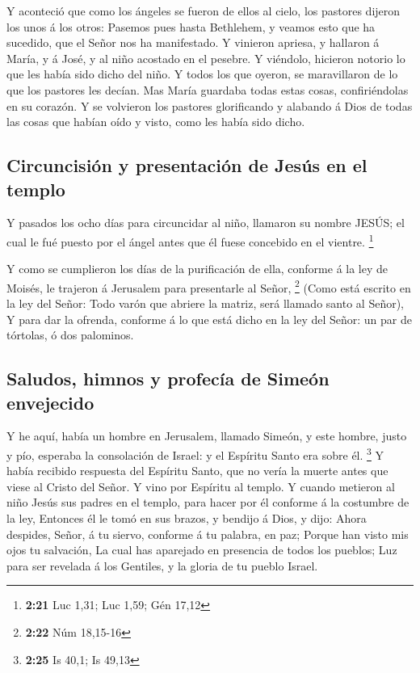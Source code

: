  Y aconteció que como los ángeles se fueron de ellos al
cielo, los pastores dijeron los unos á los otros: Pasemos pues hasta
Bethlehem, y veamos esto que ha sucedido, que el Señor nos ha
manifestado.  Y vinieron apriesa, y hallaron á María, y á
José, y al niño acostado en el pesebre.  Y viéndolo,
hicieron notorio lo que les había sido dicho del niño.  Y
todos los que oyeron, se maravillaron de lo que los pastores les decían.
 Mas María guardaba todas estas cosas, confiriéndolas en
su corazón.  Y se volvieron los pastores glorificando y
alabando á Dios de todas las cosas que habían oído y visto, como les
había sido dicho.

\hypertarget{circuncisiuxf3n-y-presentaciuxf3n-de-jesuxfas-en-el-templo}{%
\subsection{Circuncisión y presentación de Jesús en el
templo}\label{circuncisiuxf3n-y-presentaciuxf3n-de-jesuxfas-en-el-templo}}

 Y pasados los ocho días para circuncidar al niño,
llamaron su nombre JESÚS; el cual le fué puesto por el ángel antes que
él fuese concebido en el vientre. \footnote{\textbf{2:21} Luc 1,31; Luc
  1,59; Gén 17,12}

 Y como se cumplieron los días de la purificación de
ella, conforme á la ley de Moisés, le trajeron á Jerusalem para
presentarle al Señor, \footnote{\textbf{2:22} Núm 18,15-16}
 (Como está escrito en la ley del Señor: Todo varón que
abriere la matriz, será llamado santo al Señor),  Y para
dar la ofrenda, conforme á lo que está dicho en la ley del Señor: un par
de tórtolas, ó dos palominos.

\hypertarget{saludos-himnos-y-profecuxeda-de-simeuxf3n-envejecido}{%
\subsection{Saludos, himnos y profecía de Simeón
envejecido}\label{saludos-himnos-y-profecuxeda-de-simeuxf3n-envejecido}}

 Y he aquí, había un hombre en Jerusalem, llamado Simeón,
y este hombre, justo y pío, esperaba la consolación de Israel: y el
Espíritu Santo era sobre él. \footnote{\textbf{2:25} Is 40,1; Is 49,13}
 Y había recibido respuesta del Espíritu Santo, que no
vería la muerte antes que viese al Cristo del Señor.  Y
vino por Espíritu al templo. Y cuando metieron al niño Jesús sus padres
en el templo, para hacer por él conforme á la costumbre de la ley,
 Entonces él le tomó en sus brazos, y bendijo á Dios, y
dijo:  Ahora despides, Señor, á tu siervo, conforme á tu
palabra, en paz;  Porque han visto mis ojos tu salvación,
 La cual has aparejado en presencia de todos los pueblos;
 Luz para ser revelada á los Gentiles, y la gloria de tu
pueblo Israel.

